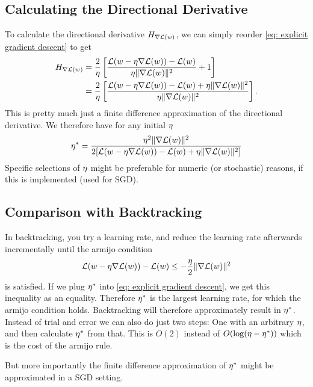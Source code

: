 \subsection{Calculating the Directional Derivative}

To calculate the directional derivative \(H_{\nabla\mathcal{L}(w)}\), we can simply
reorder \eqref{eq: explicit gradient descent} to get
\begin{align*}
	H_{\nabla\mathcal{L}(w)}
	&= \frac2{\eta}\left[
		\frac{\mathcal{L}(w-\eta\nabla\mathcal{L}(w))-\mathcal{L}(w)}{\eta\|\nabla\mathcal{L}(w)\|^2} + 1
	\right]\\
	&= \frac2{\eta}\left[
		\frac{\mathcal{L}(w-\eta\nabla\mathcal{L}(w))-\mathcal{L}(w) + \eta\|\nabla\mathcal{L}(w)\|^2}{\eta\|\nabla\mathcal{L}(w)\|^2}
	\right].
\end{align*}
This is pretty much just a finite difference approximation of the directional
derivative.
We therefore have for any initial \(\eta\)
\begin{align*}
	\eta^* = \frac{
		\eta^2 \|\nabla\mathcal{L}(w)\|^2
	}{2[\mathcal{L}(w-\eta\nabla\mathcal{L}(w))-\mathcal{L}(w) +\eta\|\nabla\mathcal{L}(w)\|^2]}
\end{align*}
Specific selections of \(\eta\) might be preferable for numeric (or stochastic)
reasons, if this is implemented (used for SGD).

\subsection{Comparison with Backtracking}

In backtracking, you try a learning rate, and reduce the learning rate afterwards
incrementally until the armijo condition
\begin{align*}
	\mathcal{L}(w-\eta\nabla\mathcal{L}(w)) -\mathcal{L}(w) \le - \frac{\eta}2 \|\nabla\mathcal{L}(w)\|^2
\end{align*}
is satisfied. If we plug \(\eta^*\) into \eqref{eq: explicit gradient descent},
we get this inequality as an equality. Therefore \(\eta^*\) is the largest
learning rate, for which the armijo condition holds. Backtracking will therefore
approximately result in \(\eta^*\). Instead of trial and error we can also do
just two steps: One with an arbitrary \(\eta\), and then calculate \(\eta^*\) from
that. This is \(O(2)\) instead of \(O(\log(\eta - \eta^*))\) which is the
cost of the armijo rule.

But more importantly the finite difference approximation of \(\eta^*\) might
be approximated in a SGD setting.
